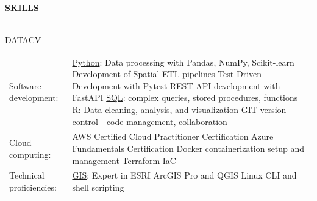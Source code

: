 \documentclass[letterpaper]{article}
\newcommand{\lineunder} {
        \vspace*{-8pt} \\
        \hspace*{-18pt} \hrulefill \\
    }
\newcommand{\header} [1] {
        \vspace{9pt}
        {\hspace*{-18pt}\vspace*{6pt} \large \textbf {#1}}
        \vspace*{-6pt} \lineunder
        \vspace{2pt}
    }
\newenvironment{skillslist}
        {
            \hspace*{-0.07in}\begin{tabular}[t]{ l L{5.17in} }
        }{
            \end{tabular}
        }
\newcommand{\impt}[1]{\uline{#1}}
\begin{document}
\header{SKILLS}
    \begin{taggedblock}{DATACV}
        \begin{skillslist}
            Software development:&
                \impt{Python}: Data processing with Pandas, NumPy, Scikit-learn \linebreak
                Development of Spatial ETL pipelines \linebreak
                Test-Driven Development with Pytest \linebreak
                REST API development with FastAPI \linebreak
                \impt{SQL}: complex queries, stored procedures, functions \linebreak
                \impt{R}: Data cleaning, analysis, and visualization \linebreak
                GIT version control - code management, collaboration \linebreak
                \\
            Cloud computing:&
                AWS Certified Cloud Practitioner Certification \linebreak
                Azure Fundamentals Certification \linebreak
                Docker containerization setup and management \linebreak
                Terraform IaC \linebreak
                \\
            Technical proficiencies:&
                \impt{GIS}: Expert in ESRI ArcGIS Pro and QGIS \linebreak
                Linux CLI and shell scripting \linebreak
                \\
        \end{skillslist}
    \end{taggedblock}
\end{document}
